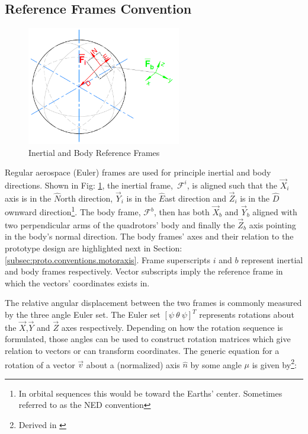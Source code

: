 \subsection{Reference Frames Convention}
\label{subsec:proto.conventions.frames}
\begin{figure}[htbp]
\centering
\includegraphics[width=0.6\textwidth]{figs/reference_frame}
\caption{Inertial and Body Reference Frames}
\label{fig:ref_frame}
\end{figure}
Regular aerospace (Euler) frames are used for principle inertial and body directions. Shown in Fig: \ref{fig:ref_frame}, the inertial frame,~$\mathcal{F}^i$, is aligned such that the $\vec{X}_i$ axis is in the $\hat{N}$orth direction, $\vec{Y}_i$ is in the $\hat{E}$ast direction and $\vec{Z}_i$ is  in the $\hat{D}$ownward direction\footnote{In orbital sequences this would be toward the Earths' center. Sometimes referred to as the NED convention}. The body frame, $\mathcal{F}^b$, then has both $\vec{X}_b$ and $\vec{Y}_b$ aligned with two perpendicular arms of the quadrotors' body and finally the $\vec{Z}_b$ axis pointing in the body's normal direction. The body frames' axes and their relation to the prototype design are highlighted next in Section:\ref{subsec:proto.conventions.motoraxis}. Frame superscripts $i$ and $b$ represent inertial and body frames respectively. Vector subscripts imply the reference frame in which the vectors' coordinates exists in. 
\par
The relative angular displacement between the two frames is commonly measured by the three angle Euler set. The Euler set $[\psi ~\theta ~\psi]^T$ represents rotations about the $\vec{X}$,$\vec{Y}$ and $\vec{Z}$ axes respectively. Depending on how the rotation sequence is formulated, those angles can be used to construct rotation matrices which give relation to vectors or can transform coordinates. The generic equation for a rotation of a vector $\vec{v}$ about a (normalized) axis $\hat{n}$ by some angle $\mu$ is given by\footnote{Derived in \cite{quaddynamics}}:
